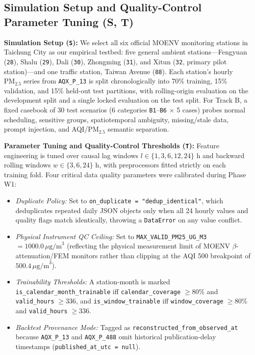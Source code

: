 \subsection{Simulation Setup and Quality-Control Parameter Tuning (S, T)}
\textbf{Simulation Setup (\texttt{S}):} We select all six official MOENV monitoring stations in Taichung City as our empirical testbed: five general ambient stations---Fengyuan (\texttt{28}), Shalu (\texttt{29}), Dali (\texttt{30}), Zhongming (\texttt{31}), and Xitun (\texttt{32}, primary pilot station)---and one traffic station, Taiwan Avenue (\texttt{88}). Each station's hourly $\text{PM}_{2.5}$ series from \texttt{AQX\_P\_13} is split chronologically into 70\% training, 15\% validation, and 15\% held-out test partitions, with rolling-origin evaluation on the development split and a single locked evaluation on the test split. For Track B, a fixed casebook of 30 test scenarios (6 categories \texttt{B1}--\texttt{B6} $\times$ 5 cases) probes normal scheduling, sensitive groups, spatiotemporal ambiguity, missing/stale data, prompt injection, and AQI/$\text{PM}_{2.5}$ semantic separation.

\textbf{Parameter Tuning and Quality-Control Thresholds (\texttt{T}):} Feature engineering is tuned over causal lag windows $l \in \{1, 3, 6, 12, 24\}\text{ h}$ and backward rolling windows $w \in \{3, 6, 24\}\text{ h}$, with preprocessors fitted strictly on each training fold. Four critical data quality parameters were calibrated during Phase W1:
\begin{itemize}
    \item \emph{Duplicate Policy:} Set to \texttt{on\_duplicate = "dedup\_identical"}, which deduplicates repeated daily JSON objects only when all 24 hourly values and quality flags match identically, throwing a \texttt{DataError} on any value conflict.
    \item \emph{Physical Instrument QC Ceiling:} Set to \texttt{MAX\_VALID\_PM25\_UG\_M3} $= 1000.0\,\mu\text{g/m}^3$ (reflecting the physical measurement limit of MOENV $\beta$-attenuation/FEM monitors rather than clipping at the AQI 500 breakpoint of $500.4\,\mu\text{g/m}^3$).
    \item \emph{Trainability Thresholds:} A station-month is marked \texttt{is\_calendar\_month\_trainable} iff \texttt{calendar\_coverage} $\ge 80\%$ and \texttt{valid\_hours} $\ge 336$, and \texttt{is\_window\_trainable} iff \texttt{window\_coverage} $\ge 80\%$ and \texttt{valid\_hours} $\ge 336$.
    \item \emph{Backtest Provenance Mode:} Tagged as \texttt{reconstructed\_from\_observed\_at} because \texttt{AQX\_P\_13} and \texttt{AQX\_P\_488} omit historical publication-delay timestamps (\texttt{published\_at\_utc = null}).
\end{itemize}

